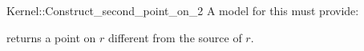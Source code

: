 \begin{ccRefFunctionObjectConcept}{Kernel::Construct_second_point_on_2}
A model for this must provide:


{returns a point on $r$ different from the source of $r$.}

\end{ccRefFunctionObjectConcept}
